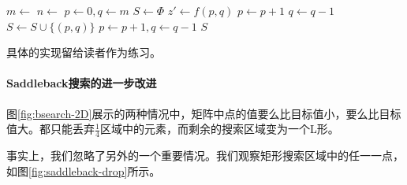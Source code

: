 \documentclass[UTF8]{article}
\begin{document}
\begin{algorithmic}[1]
  \State $m \gets$ 
  \State $n \gets$ 
  \State $p \gets 0, q \gets m$
  \State $S \gets \Phi$
    \State $z' \gets f(p, q)$
      \State $p \gets p + 1$
      \State $q \gets q - 1$
    \Else
      \State $S \gets S \cup \{(p, q)\}$
      \State $p \gets p + 1, q \gets q - 1$
    \EndIf
  \EndWhile
  \State \Return $S$
\EndFunction
\end{algorithmic}

具体的实现留给读者作为练习。

\paragraph{Saddleback搜索的进一步改进}

图\ref{fig:bsearch-2D}展示的两种情况中，矩阵中点的值要么比目标值小，要么比目标值大。都只能丢弃$\frac{1}{4}$区域中的元素，而剩余的搜索区域变为一个L形。

事实上，我们忽略了另外的一个重要情况。我们观察矩形搜索区域中的任一一点，如图\ref{fig:saddleback-drop}所示。
\end{document}
